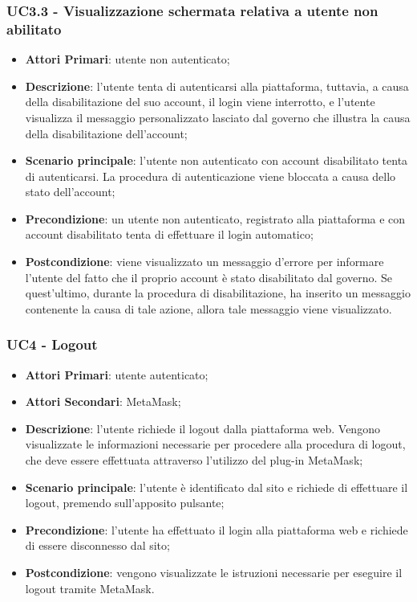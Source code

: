 \subsubsection{UC3.3 - Visualizzazione schermata relativa a utente non abilitato}
\begin{itemize}
	\item \textbf{Attori Primari}: utente non autenticato;
	\item \textbf{Descrizione}:
	l'utente tenta di autenticarsi alla piattaforma, tuttavia, a causa della disabilitazione del suo account, il login viene interrotto, e l'utente visualizza il messaggio personalizzato lasciato dal governo che illustra la causa della disabilitazione dell'account;
	\item \textbf{Scenario principale}:
	l'utente non autenticato con account disabilitato tenta di autenticarsi. La procedura di autenticazione viene bloccata a causa dello stato dell'account;
	\item \textbf{Precondizione}:
	un utente non autenticato, registrato alla piattaforma e con account disabilitato tenta di effettuare il login automatico;
	\item \textbf{Postcondizione}:  viene visualizzato un messaggio d'errore per informare l'utente del fatto che il proprio account è stato disabilitato dal governo\glo. Se quest'ultimo, durante la procedura di disabilitazione, ha inserito un messaggio contenente la causa di tale azione, allora tale messaggio viene visualizzato.
\end{itemize}
\subsubsection{UC4 - Logout}
\begin{itemize}
	\item \textbf{Attori Primari}:
	utente autenticato;
	\item \textbf{Attori Secondari}:
	MetaMask\glo;
	\item \textbf{Descrizione}: l'utente richiede il logout dalla piattaforma web. Vengono visualizzate le informazioni necessarie per procedere alla procedura di logout, che deve essere effettuata attraverso l'utilizzo del plug-in MetaMask\glo;
	\item \textbf{Scenario principale}: l'utente è identificato dal sito e richiede di effettuare il logout, premendo sull'apposito pulsante;
	\item \textbf{Precondizione}: l'utente ha effettuato il login alla piattaforma web e richiede di essere disconnesso dal sito;
	\item \textbf{Postcondizione}: vengono visualizzate le istruzioni necessarie per eseguire il logout tramite MetaMask\glo. 
\end{itemize}

